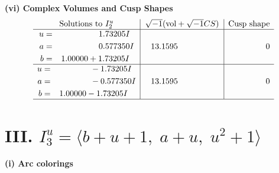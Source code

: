 \documentclass[1p]{elsarticle_modified}
\theoremstyle{definition}
\newcommand{\I}{\sqrt{-1}}
\begin{document}
\newpage\flushleft \textbf{(vi) Complex Volumes and Cusp Shapes}
$$\begin{array}{c|c|c}  
\text{Solutions to }I^u_{2}& \I (\text{vol} + \sqrt{-1}CS) & \text{Cusp shape}\\
 \hline 
\begin{aligned}
u &= \phantom{-0.000000 -}1.73205 I \\
a &= \phantom{-0.000000 -}0.577350 I \\
b &= \phantom{-}1.00000 + 1.73205 I\end{aligned}
 & \phantom{-}13.1595\phantom{ +0.000000I} & \phantom{-0.000000 } 0 \\ \hline\begin{aligned}
u &= \phantom{-0.000000 } -1.73205 I \\
a &= \phantom{-0.000000 } -0.577350 I \\
b &= \phantom{-}1.00000 - 1.73205 I\end{aligned}
 & \phantom{-}13.1595\phantom{ +0.000000I} & \phantom{-0.000000 } 0\\
 \hline 
 \end{array}$$\newpage\newpage\renewcommand{\arraystretch}{1}
\centering \section*{III. $I^u_{3}= \langle b+u+1,\;a+u,\;u^2+1 \rangle$}
\flushleft \textbf{(i) Arc colorings}\\
\end{document}
